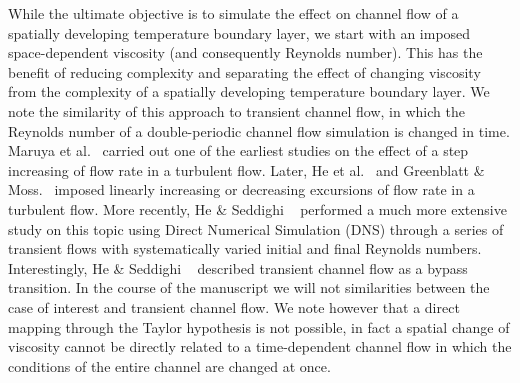 \documentclass[twocolumn,10pt]{asme2e}
\begin{document}
While the ultimate objective is to simulate the effect on channel flow of a spatially developing temperature boundary layer, we start with an imposed  space-dependent viscosity (and consequently Reynolds number). This has the benefit of reducing complexity and separating the effect of changing viscosity from the complexity of a spatially developing temperature boundary layer. We note the similarity of this approach to transient channel flow, in which the Reynolds number of a double-periodic channel flow simulation is changed in time.  Maruya et al.~\cite{maruyama1976} carried out one of the earliest studies on the effect of a step increasing of flow rate in a turbulent flow. Later, He et al.~\cite{he2000} and  Greenblatt \& Moss.~\cite{greenblatt2004} imposed linearly increasing or decreasing excursions of flow rate in a turbulent flow. More recently, He \& Seddighi ~\cite{he2015} performed a much more extensive study on this topic using Direct Numerical Simulation (DNS) through a series of transient flows with systematically varied initial and final Reynolds numbers. Interestingly, He \& Seddighi ~\cite{he2015}  described transient channel flow as a bypass transition. In the course of the manuscript we will not similarities between the case of interest and transient channel flow. We note however that a direct mapping through the Taylor hypothesis is not possible, in fact a spatial change of viscosity cannot be directly related to a time-dependent channel flow in which the conditions of the entire channel are changed at once.
\end{document}
